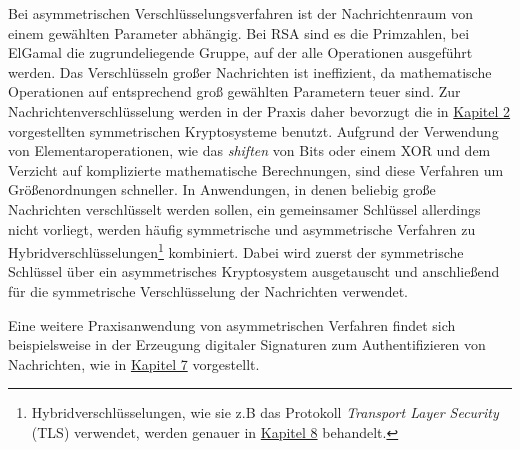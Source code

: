 Bei asymmetrischen Verschlüsselungsverfahren ist der Nachrichtenraum von einem gewählten Parameter abhängig. Bei RSA sind es die Primzahlen, bei ElGamal die zugrundeliegende Gruppe, auf der alle Operationen ausgeführt werden. Das Verschlüsseln großer Nachrichten ist ineffizient, da mathematische Operationen auf entsprechend groß gewählten Parametern teuer sind. Zur Nachrichtenverschlüsselung werden in der Praxis daher bevorzugt die in \hyperref[cha:symencryption]{Kapitel 2} vorgestellten symmetrischen Kryptosysteme benutzt. Aufgrund der Verwendung von Elementaroperationen, wie das \textit{shiften} von Bits oder einem XOR und dem Verzicht auf komplizierte mathematische Berechnungen, sind diese Verfahren um Größenordnungen schneller. In Anwendungen, in denen beliebig große Nachrichten verschlüsselt werden sollen, ein gemeinsamer Schlüssel allerdings nicht vorliegt, werden häufig symmetrische und asymmetrische Verfahren zu Hybridverschlüsselungen\footnote{Hybridverschlüsselungen, wie sie z.B das Protokoll \textit{Transport Layer Security} (TLS) verwendet, werden genauer in \hyperref[cha:keyexchange]{Kapitel 8} behandelt.} kombiniert. Dabei wird zuerst der symmetrische Schlüssel über ein asymmetrisches Kryptosystem ausgetauscht und anschließend für die symmetrische Verschlüsselung der Nachrichten verwendet.

Eine weitere Praxisanwendung von asymmetrischen Verfahren findet sich beispielsweise in der Erzeugung digitaler Signaturen zum Authentifizieren von Nachrichten, wie in \hyperref[cha:asymmauth]{Kapitel 7} vorgestellt.